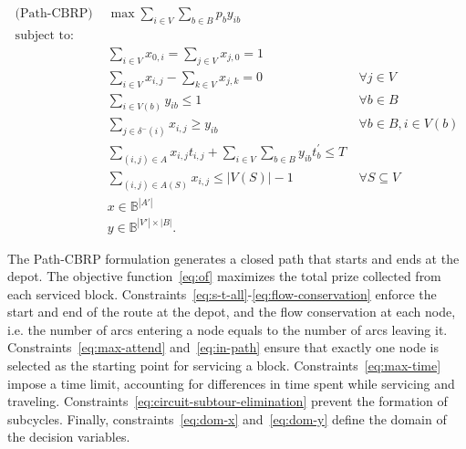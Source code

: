 \begin{align}
	\text{(Path-CBRP) }          & \max \sum_{i \in V} \sum_{b \in B} p_b y_{ib}                                             & \label{eq:of}                                                  \\
	\nonumber \text{subject to:} &                                                                                           &                                                                \\
	                             & \sum_{i \in V} x_{0,i} = \sum_{j \in V} x_{j,0} = 1                                       & \label{eq:s-t-all}                                             \\
	                             & \sum_{i \in V} x_{i,j} - \sum_{k \in V} x_{j,k} = 0                                       & \ \forall j \in V \label{eq:flow-conservation}                 \\
	                             & \sum_{i \in V(b)} y_{ib} \leq 1                                                           & \ \forall b \in B \label{eq:max-attend}                        \\
	                             & \sum_{j \in \delta^{-}(i)} x_{i,j} \geq y_{ib}                                            & \ \forall b \in B, i \in V(b) \label{eq:in-path}               \\
	                             & \sum_{(i, j) \in A} x_{i,j}t_{i,j} + \sum_{i \in V} \sum_{b \in B} y_{ib}t^{'}_{b} \leq T & \label{eq:max-time}                                            \\
	                             & \sum_{(i, j) \in A(S)} x_{i,j} \leq |V(S)| - 1                                            & \ \forall S \subseteq V \label{eq:circuit-subtour-elimination} \\	
	                             & x \in \mathbb{B}^{|A'|}                                                                   & \label{eq:dom-x}                                               \\
	                             & y \in \mathbb{B}^{|V'| \times |B|}.                                                       & \label{eq:dom-y}
\end{align}


The Path-CBRP formulation generates a closed path that starts and ends at the
depot. The objective function~\eqref{eq:of} maximizes the total prize collected
from each serviced block.
Constraints~\eqref{eq:s-t-all}-\eqref{eq:flow-conservation} enforce the start
and end of the route at the depot, and the flow conservation at each node, i.e.
the number of arcs entering a node equals to the number of arcs leaving it.
Constraints~\eqref{eq:max-attend} and~\eqref{eq:in-path} ensure that exactly one
node is selected as the starting point for servicing a block.
Constraints~\eqref{eq:max-time} impose a time limit, accounting for differences
in time spent while servicing and traveling.
Constraints~\eqref{eq:circuit-subtour-elimination} prevent the formation of
subcycles. Finally, constraints~\eqref{eq:dom-x} and~\eqref{eq:dom-y} define the
domain of the decision variables.

